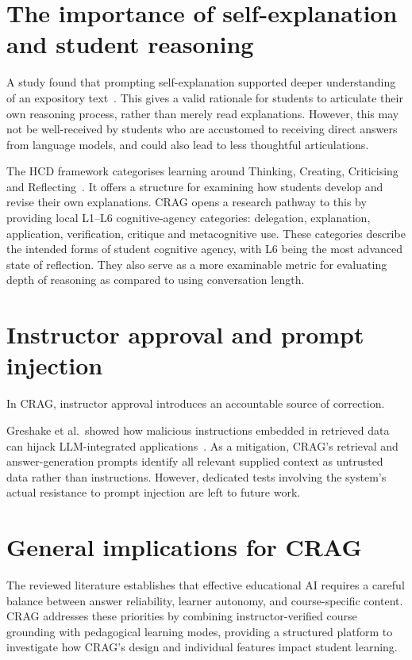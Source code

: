 \section{The importance of self-explanation and student reasoning}
A study found that prompting self-explanation supported deeper understanding of an expository text~\parencite{chi}. This gives a valid rationale for students to articulate their own reasoning process, rather than merely read explanations. However, this may not be well-received by students who are accustomed to receiving direct answers from language models, and could also lead to less thoughtful articulations.


The HCD framework categorises learning around Thinking, Creating, Criticising and Reflecting~\parencite{hcd}. It offers a structure for examining how students develop and revise their own explanations. CRAG opens a research pathway to this by providing local L1--L6 cognitive-agency categories: delegation, explanation, application, verification, critique and metacognitive use. These categories describe the intended forms of student cognitive agency, with L6 being the most advanced state of reflection. They also serve as a more examinable metric for evaluating depth of reasoning as compared to using conversation length.

\section{Instructor approval and prompt injection}
In CRAG, instructor approval introduces an accountable source of correction.

Greshake et al.\ showed how malicious instructions embedded in retrieved data can hijack LLM-integrated applications~\parencite{greshake}. As a mitigation, CRAG's retrieval and answer-generation prompts identify all relevant supplied context as untrusted data rather than instructions. However, dedicated tests involving the system's actual resistance to prompt injection are left to future work.

\section{General implications for CRAG}
The reviewed literature establishes that effective educational AI requires a careful balance between answer reliability, learner autonomy, and course-specific content. CRAG addresses these priorities by combining instructor-verified course grounding with pedagogical learning modes, providing a structured platform to investigate how CRAG's design and individual features impact student learning.

